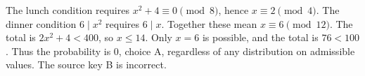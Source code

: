 The lunch condition requires $x^2+4\equiv0\pmod8$, hence $x\equiv2\pmod4$. The dinner condition $6\mid x^2$ requires $6\mid x$. Together these mean $x\equiv6\pmod{12}$. The total is $2x^2+4<400$, so $x\le14$. Only $x=6$ is possible, and the total is $76<100$. Thus the probability is $\boxed0$, choice A, regardless of any distribution on admissible values. The source key B is incorrect.
